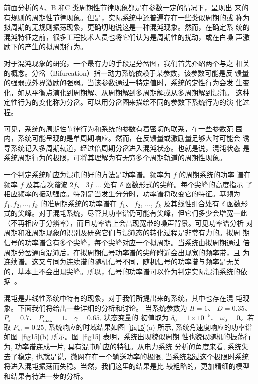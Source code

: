 \documentclass[withoutpreface,bwprint]{cumcmthesis} %
\begin{document}
    前面分析的A、B 和C 类周期性节律现象都是在参数一定的情况下，呈现出
    来的有规则的周期性节律现象。但是，实际系统中还普遍存在一些类似周期的或
    称为拟周期的无规则振荡现象，更确切地说这是一种混沌现象。然而，在确定系
    统的混沌特征之前，很多工程技术人员也将它们认为是周期性的扰动，或在白噪
    声激励下的产生的拟周期行为。

    对于混沌现象的研究，一个最有力的手段是分岔图，我们首先介绍两个与之
    相关的概念。分岔（Bifurcation）指一动力系统依赖于某参数，该参数可能是反
    馈量的强弱或外界激励的强弱。当该参数通过一特定值时，系统的定性行为会发
    生变化，如从平衡点演化到周期解、从周期解到多周期解或从多周期解到混沌。
    这种定性行为的变化称为分岔。可以用分岔图来描绘不同的参数下系统行为的演
    化过程。

    可见，系统的周期性节律行为和系统的参数有着密切的联系，在一些参数范
    围内，系统可能呈现的是单周期响应。然而，在反馈量或激励量足够大时可能会
    诱导系统记入多周期轨道，经过倍周期分岔进入混沌状态。也就是说，混沌状态
    是系统周期行为的极限，可将其理解为有无穷多个周期轨道的周期性现象。

一个判定系统响应为混屯的好的方法是功率谱。频率为 $ f $ 的周期系统的功率 谱在频率 $ f $ 及其高次谐波  $2 f $、 $3 f$ $\ldots$ 处有 $ \delta $ 函数形式的尖峰。每个尖峰的高度指示 了相应频率的振动强度。特别是当发生分分时，功率谱将改变它的特征。基频为 $ f_{1}, f_{2}, \ldots, f_{k}$  的准周期系统的功率谱在 $ f_{1} $、 $f_{2}$, $\ldots$, $f_{k}$  及其线性组合处有 $ \delta$  函数形 式的尖峰。对于混屯系统，尽管其功率谱仍可能有尖峰，但它们多少会增宽一此
（不再相应于分辨率），而且功率谱上会出现宽带的噪声背景。可见功率谱分析
对周期和准周期现象的识别及研究它们与混沌态的转化过程是非常有力的。拟周
期信号的功率谱含有多个尖峰，每个尖峰对应一个拟周期。当系统由拟周期通过
倍周期分岔通向混沌后，在拟周期信号功率谱的尖峰附近会出现宽的频率带，且
为连续谱。这又与同为连续谱的随机信号不同，随机信号的功率谱与频率是无关
的，基本上不会出现尖峰。所以，信号的功率谱可以作为判定实际混沌系统的依
据~。

混屯是非线性系统中特有的现象，对于我们所提出来的系统，其中也存在混 屯现象。下面我们将给出一些详细的分析和讨论。 当系统参数为 $ H=1 $、 $D=0.35 $、 $P_{\varepsilon}=0.7 $、 $P_{\max }=1 $、 $\gamma=0.65 $, 状态变量的
初值取为  $\delta_{0}=1 \times 10^{-5} $、 $\omega_{0}=0  $。若取 $ P_{m}=0.25 $, 系统响应的时域结果如图~\ref{fig15}(a)
所示, 系统角速度响应的功率谱如图~\ref{fig15}(b)  所示。图~\ref{fig15} 表明，系统出现貌似周期 性也貌似随机的振荡行为, 功率谱连成一片, 具有混屯响应的特征。从电力系统 分析的角度来看, 系统失去了稳定, 也就是说，微网存在一个输送功率的极限, 当系统超过这个极限时系统将进入混屯振荡而失稳。当然，我们这里的结果是比 较粗略的，更加精细的模型和结果有待进一步的分析。
\end{document}
